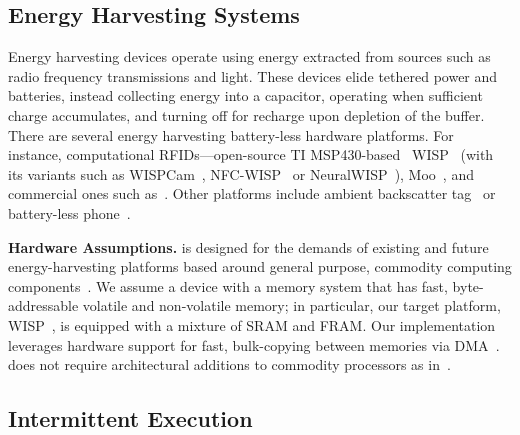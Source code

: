 \subsection{Energy Harvesting Systems}
\label{sec:background_harvesting}

Energy harvesting devices operate using energy extracted from sources such as
radio frequency transmissions and light. These devices elide tethered
power and batteries, instead collecting energy into a capacitor, operating when
sufficient charge accumulates, and turning off for recharge upon depletion of the buffer.
There are several energy harvesting battery-less hardware platforms. For
instance, computational RFIDs---open-source TI MSP430-based~\cite{wolverine}
WISP~\cite{wisp5} (with its variants such as
WISPCam~\cite{naderiparizi_rfid_2015}, NFC-WISP~\cite{zhao_rfid_2015} or
NeuralWISP~\cite{holleman_biocas_2008}), Moo~\cite{moo}, and commercial ones
such as~\cite{medusa_farsens_2017}. Other platforms include ambient backscatter
tag~\cite{liu_sigcomm_2013,parks_sigcomm_2014} or battery-less
phone~\cite{talla_imwut_2017}. 

\textbf{Hardware Assumptions.} \sys is designed for the demands of existing and
future energy-harvesting platforms based around general purpose, commodity
computing components~\cite{wisp,msp430datasheet}. We assume a device with a
memory system that has fast, byte-addressable volatile and non-volatile memory;
in particular, our target platform, WISP~\cite{wisp}, is equipped with a
mixture of SRAM and FRAM. Our implementation leverages hardware support for
fast, bulk-copying between memories via DMA~\cite{msp430datasheet}. \sys does not
require architectural additions to commodity processors as
in~\cite{su_date_2017,hicks_isca_2017,quickrecall,nvp}.

\subsection{Intermittent Execution}
\label{sec:background_consistency}

